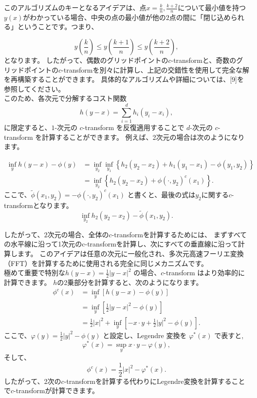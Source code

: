 \documentclass{jsarticle}
\theoremstyle{definition}
\begin{document}
このアルゴリズムのキーとなるアイデアは、点$x = \frac{k}{n},\frac{k + 2}{n}$について最小値を持つ$y(x)$がわかっている場合、中央の点の最小値が他の$2$点の間に「閉じ込められる」ということです。つまり、

$$
y\left(\frac{k}{n} \right) \leq y\left(\frac{k + 1}{n} \right) \leq y\left(\frac{k + 2}{n} \right),
$$
となります。
したがって、偶数のグリッドポイントの$c$-transformと、奇数のグリッドポイントの$c$-transformを別々に計算し、上記の交錯性を使用して完全な解を再構築することができます。
具体的なアルゴリズムや詳細については、[9]を参照してください。\\

このため、各次元で分解するコスト関数 
$$
h(y-x) = \sum_{i = 1}^{d}  h_i(y_i - x_i),
$$ に限定すると、$1$-次元の $c$-transform を反復適用することで $d$-次元の $c$-transform を計算することができます。
例えば、2次元の場合は次のようになります。

\begin{align*}
  \inf_y h(y - x) - \phi(y) &= \inf_{y_2} \inf_{y_1} \left\{ h_2(y_2 - x_2) + h_1(y_1 - x_1) - \phi(y_1, y_2) \right\}  \\
                            &= \inf_{y_2} \left\{ h_2(y_2 - x_2) + \phi(\cdot, y_2)^c(x_1) \right\}.
\end{align*}
ここで、$\tilde{\phi}(x_1, y_2) = -\phi(\cdot, y_2)^c(x_1)$ と書くと、最後の式は$y_2$に関する$c$-transformとなります。
$$
  \inf_{y_2} h_2(y_2 - x_2) - \tilde{\phi}(x_1, y_2).
$$

したがって、$2$次元の場合、全体の$c$-transformを計算するためには、
まずすべての水平線に沿って1次元のc-transformを計算し、次にすべての垂直線に沿って計算します。
このアイデアは任意の次元に一般化され、多次元高速フーリエ変換（FFT）を計算するために使用される完全に同じメカニズムです。\\

極めて重要で特別な$h(y-x)=\frac{1}{2}|y-x|^2$ の場合、$c$-transform はより効率的に計算できます。
$h$の2乗部分を計算すると、次のようになります。
\begin{align*}
  \phi^c(x) &= \inf_y \left[h(y - x) - \phi(y) \right]\\
            &= \inf_y \left[\frac{1}{2}|y-x|^2 - \phi(y) \right]\\
            &=\frac{1}{2}|x|^2+\inf_y\left[-x\cdot y+\frac{1}{2}|y|^2-\phi(y)\right].
\end{align*}
ここで、$\varphi(y)=\frac{1}{2}|y|^2-\phi(y)$ と設定し、Legendre 変換を $\varphi^*(x)$ で表すと,
\begin{equation}
  \label{eq:legendre}
  \varphi^*(x)=\sup_y x\cdot y-\varphi(y),
\end{equation}
そして、
$$\phi^c(x)=\frac{1}{2}|x|^2-\varphi^*(x).$$
したがって、2次の$c$-transformを計算する代わりにLegendre変換を計算することで$c$-transformが計算できます。
\end{document}
